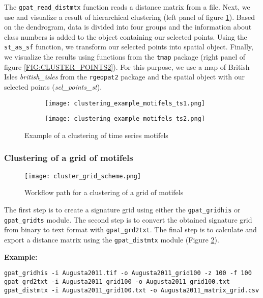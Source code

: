 The {\tt gpat\_read\_distmtx} function reads a distance matrix from a file. 
Next, we use and visualize a result of hierarchical clustering (left panel of figure \ref{FIG:CLUSTER_POINTSTS2}).
Based on the dendrogram, data is divided into four groups and the information about class numbers is added to the object containing our selected points.
Using the {\tt st\_as\_sf} function, we transform our selected points into spatial object.
Finally, we visualize the results using functions from the {\tt tmap} package (right panel of figure \ref{FIG:CLUSTER_POINTS2}).
For this purpose, we use a map of British Isles {\it british\_isles} from the {\tt rgeopat2} package and the spatial object with our selected points ({\it sel\_points\_st}).

\begin{figure}[H]
  \begin{subfigure}[b]{0.5\textwidth}
    \texttt{[image: clustering\_example\_motifels\_ts1.png]}
  \end{subfigure}
  \begin{subfigure}[b]{0.5\textwidth}
    \texttt{[image: clustering\_example\_motifels\_ts2.png]}
  \end{subfigure}
  \caption{Example of a clustering of time series motifels}
  \label{FIG:CLUSTER_POINTSTS2}
\end{figure}

\FloatBarrier

\subsubsection{Clustering of a grid of motifels}

\begin{figure}[H]
	\centering
	\texttt{[image: cluster\_grid\_scheme.png]}
	\caption{Workflow path for a clustering of a grid of motifels}
	\label{FIG:CLUSTER_GRID}
\end{figure}

The first step is to create a signature grid using either the {\tt gpat\_gridhis} or {\tt gpat\_gridts} module.
The second step is to convert the obtained signature grid from binary to text format with {\tt gpat\_grd2txt}.
The final step is to calculate and export a distance matrix using the {\tt gpat\_distmtx} module (Figure \ref{FIG:CLUSTER_GRID}).

{\bf Example:}

\begin{minipage}{\linewidth}
\begin{lstlisting}
gpat_gridhis -i Augusta2011.tif -o Augusta2011_grid100 -z 100 -f 100
gpat_grd2txt -i Augusta2011_grid100 -o Augusta2011_grid100.txt
gpat_distmtx -i Augusta2011_grid100.txt -o Augusta2011_matrix_grid.csv
\end{lstlisting}
\end{minipage}


